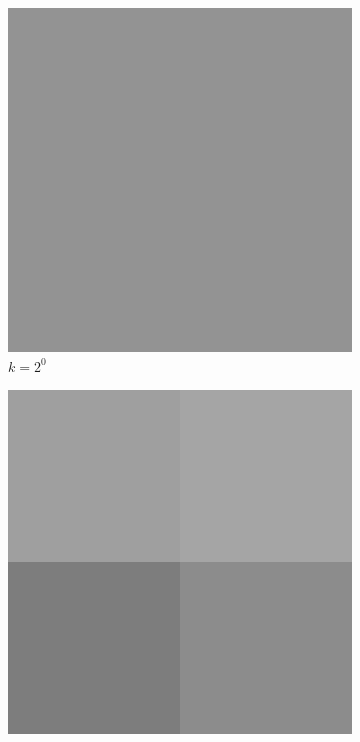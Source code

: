 \begin{figure}[H]
    \centering
    \caption{Result of High Frequency Image After DHWT}
    \begin{subfigure}[b]{0.3\textwidth}
        \centering
        \includegraphics[width=\textwidth]{problem2/high_freq_1.bmp}
        \caption{$k = 2^0$}
    \end{subfigure}
    \hfill
    \begin{subfigure}[b]{0.3\textwidth}
        \centering
        \includegraphics[width=\textwidth]{problem2/high_freq_2.bmp}

\end{subfigure}
\end{figure}
